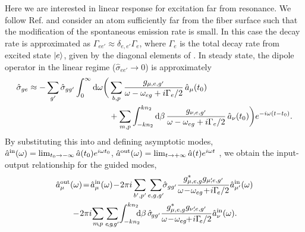 \documentclass[preprint, aps,pra,onecolumn]{revtex4-1} %
\newcommand{\inp}{{\rm in}}
\newcommand{\out}{{\rm out}}
\begin{document}
Here we are interested in linear response for excitation far from resonance. We follow Ref. \cite{le_kien_propagation_2014} and consider an atom sufficiently far from the fiber surface such that the modification of the spontaneous emission rate is small.   In this case the decay rate is approximated as $\Gamma_{ee'} \approx \delta_{e,e'} \Gamma_{e}$, where $\Gamma_e$ is the total decay rate from excited state $\lvert{e}\rangle$, given by the diagonal elements of .  In steady state, the dipole operator in the linear regime ($\hat{\sigma}_{ee'} \rightarrow 0 $) is approximately
	\begin{align}
		\hat{\sigma}_{ge} \approx -\sum_{g'} \hat{\sigma}_{gg'}\int_0^{\infty}\mathrm{d}\omega \bigg( & \sum_{b,p}  
\frac{g_{\mu, e,g'}}{\omega-\omega_{eg} + i \Gamma_{e}/2  }\, \hat{a}_\mu (t_0) \\
	&+\sum_{m,p} \int_{-kn_2}^{kn_2}\mathrm{d}\beta \, \frac{g_{\nu, e,g'}}{\omega-\omega_{eg} + i \Gamma_{e}/2 } \,\hat{a}_\nu (t_0)  \bigg)e^{-i\omega (t-t_0)} . \nonumber
	\end{align}
By substituting this into  and defining asymptotic modes, $\hat{a}^{\inp}(\omega) = \lim_{t_0\rightarrow -\infty} \hat{a}(t_0) e^{i\omega t_0}$, $\hat{a}^{\out}(\omega) = \lim_{t\rightarrow +\infty} \hat{a}(t) e^{i\omega t}$ \cite{fan_input-output_2010}, we obtain the input-output relationship for the guided modes, 
	\begin{align} \label{Eq::aout}
		\hat{a}^{\out}_\mu (\omega) &\!=\! \hat{a}^{\inp}_\mu (\omega) \!-\! 2\pi i\sum_{b',p'} 
\sum_{e,g,g'}\!\!\hat{\sigma}_{gg'}\frac{ g_{\mu,e,g}^* g_{\mu'\!\!,e,g'}}{ \omega \!-\! \omega_{eg} \!+\! i \Gamma\!_{e}/2 }\hat{a}^{\inp}_{\mu'}(\omega) \nn\\
&\!\!\!\!\!\!\!\!-\! 2\pi i\!\sum_{m\!,p} \sum_{e\!,g\!,g'}\! \int^{kn_2}_{-kn_2}\!\!\!\! \mathrm{d}\beta \,\hat{\sigma}\!_{gg'}\frac{ g_{\mu,e,g}^* g_{\nu'\!\!,e,g'}}{ \omega \!-\! \omega_{eg} \!\!+\! i \Gamma\!_{e}/2 }\hat{a}^{\inp}_{\nu}(\omega).
	\end{align}
	
\end{document}

